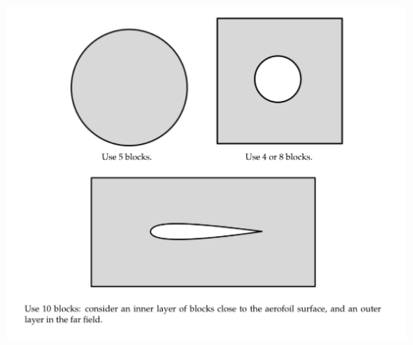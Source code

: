 \documentclass{article}
\begin{document}
\begin{center}
  \includegraphics[width=1.1\textwidth]{multi-block-domains.png}
\end{center}
\end{document}
